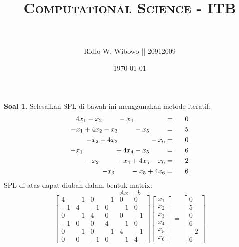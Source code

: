 \documentclass[paper=a4, fontsize=11pt]{scrartcl}
\title{	
\normalfont \normalsize 
\textsc{Computational Science - ITB} \\ [25pt] %
\horrule{0.5pt} \\[0.4cm] %
}
\author{\small{Ridlo W. Wibowo || 20912009}} %
\date{\normalsize\today} %
\numberwithin{equation}{section} %
\numberwithin{figure}{section} %
\numberwithin{table}{section} %
\begin{document}
\maketitle %

\large \textbf{Soal 1.}
Selesaikan SPL di bawah ini menggunakan metode iteratif:
\begin{eqnarray}
	4x_{1} - x_{2} \hspace{0.8cm}  - x_{4} \hspace{0.8cm} \hspace{0.8cm} &=& 0 \nonumber \\
	- x_{1} + 4x_{2} - x_{3} \hspace{0.8cm} - x_{5} \hspace{0.8cm} &=& 5 \nonumber \\
	\hspace{0.8cm} - x_{2} + 4x_{3}  \hspace{0.8cm} \hspace{0.8cm} - x_{6} &=& 0 \nonumber \\
	- x_{1} \hspace{0.8cm} \hspace{0.8cm} + 4x_{4} - x_{5} \hspace{0.8cm} &=& 6 \nonumber \\
	\hspace{0.8cm} - x_{2} \hspace{0.8cm} - x_{4} + 4x_{5} - x_{6} &=& -2 \nonumber \\
	\hspace{0.8cm} \hspace{0.8cm} - x_{3} \hspace{0.8cm} - x_{5} + 4x_{6} &=& 6 \nonumber \\
\end{eqnarray}
SPL di atas dapat diubah dalam bentuk matrix:\\
\begin{equation}
 Ax = b
\end{equation}
\[
 \begin{bmatrix}
  4 & -1 & 0 & -1 & 0 & 0 \\
  -1 & 4 & -1 & 0 & -1 & 0 \\
  0 & -1 & 4 & 0 & 0 & -1 \\
  -1 & 0 & 0 & 4 & -1 & 0 \\
 0 & -1 & 0 & -1 & 4 & -1 \\
  0 & 0 & -1 & 0 & -1 & 4 
 \end{bmatrix}
 \begin{bmatrix}
  x_{1} \\
  x_{2} \\
  x_{3} \\
  x_{4} \\
  x_{5} \\
  x_{6} 
 \end{bmatrix}
=
 \begin{bmatrix}
  0 \\
  5 \\
  0 \\
  6 \\
  -2 \\
  6 
 \end{bmatrix}
\]
\end{document}
